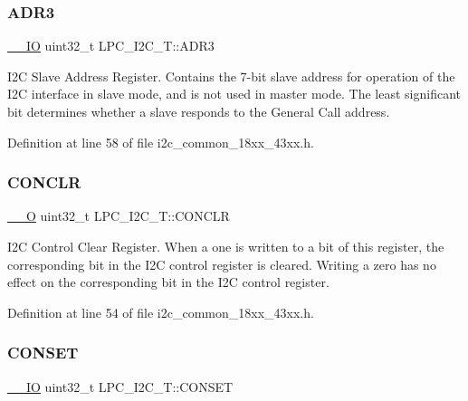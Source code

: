 \subsubsection{\texorpdfstring{A\+D\+R3}{ADR3}}
{\footnotesize\ttfamily \hyperlink{core__sc300_8h_aec43007d9998a0a0e01faede4133d6be}{\+\_\+\+\_\+\+IO} uint32\+\_\+t L\+P\+C\+\_\+\+I2\+C\+\_\+\+T\+::\+A\+D\+R3}

I2C Slave Address Register. Contains the 7-\/bit slave address for operation of the I2C interface in slave mode, and is not used in master mode. The least significant bit determines whether a slave responds to the General Call address. 

Definition at line 58 of file i2c\+\_\+common\+\_\+18xx\+\_\+43xx.\+h.

\mbox{\label{struct_l_p_c___i2_c___t_a091c12dd25fb7db692339da933c8b523}} 
\subsubsection{\texorpdfstring{C\+O\+N\+C\+LR}{CONCLR}}
{\footnotesize\ttfamily \hyperlink{core__sc300_8h_a7e25d9380f9ef903923964322e71f2f6}{\+\_\+\+\_\+O} uint32\+\_\+t L\+P\+C\+\_\+\+I2\+C\+\_\+\+T\+::\+C\+O\+N\+C\+LR}

I2C Control Clear Register. When a one is written to a bit of this register, the corresponding bit in the I2C control register is cleared. Writing a zero has no effect on the corresponding bit in the I2C control register. 

Definition at line 54 of file i2c\+\_\+common\+\_\+18xx\+\_\+43xx.\+h.

\mbox{\label{struct_l_p_c___i2_c___t_a98ed6d816b3c7e00a29b32956fe5fa2d}} 
\subsubsection{\texorpdfstring{C\+O\+N\+S\+ET}{CONSET}}
{\footnotesize\ttfamily \hyperlink{core__sc300_8h_aec43007d9998a0a0e01faede4133d6be}{\+\_\+\+\_\+\+IO} uint32\+\_\+t L\+P\+C\+\_\+\+I2\+C\+\_\+\+T\+::\+C\+O\+N\+S\+ET}

